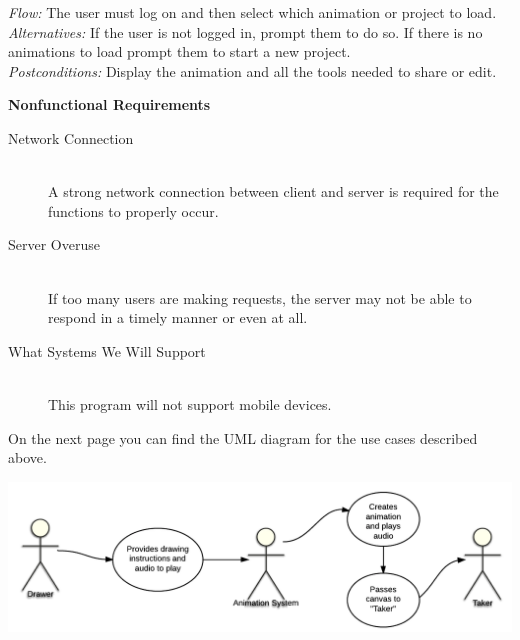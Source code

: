 \documentclass[12pt]{article}
\begin{document}
\begin{description}
\textit{Flow:} The user must log on and then select which animation or project to load.\\

\textit{Alternatives:} If the user is not logged in, prompt them to do so. If there is no animations to load prompt them to start a new project.\\

\textit{Postconditions:} Display the animation and all the tools needed to share or edit.\\
\end{description}

\textbf{Nonfunctional Requirements}
\begin{description}
\item[Network Connection]\hfill\\
    A strong network connection between client and server is required for the functions to properly occur.
\item[Server Overuse]\hfill\\
    If too many users are making requests, the server may not be able to respond in a timely manner or even at all.
\item[What Systems We Will Support]\hfill\\
    This program will not support mobile devices.
\end{description}

On the next page you can find the UML diagram for the use cases described above.

\begin{center}
\includegraphics[scale=1]{UML}
\end{center}
\end{document}
